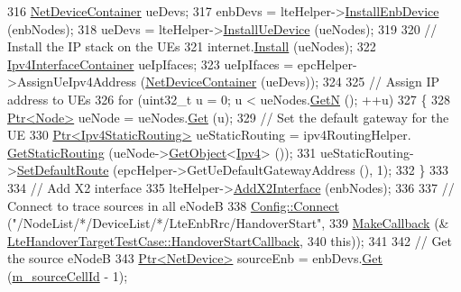 \begin{DoxyCode}
316   \hyperlink{classns3_1_1NetDeviceContainer}{NetDeviceContainer} ueDevs;
317   enbDevs = lteHelper->\hyperlink{classns3_1_1LteHelper_a5e009ad35ef85f46b5a6099263f15a03}{InstallEnbDevice} (enbNodes);
318   ueDevs = lteHelper->\hyperlink{classns3_1_1LteHelper_ac9cd932d7de92811cfa953c2e3b2fc9f}{InstallUeDevice} (ueNodes);
319 
320   \textcolor{comment}{// Install the IP stack on the UEs}
321   internet.\hyperlink{classns3_1_1InternetStackHelper_a6645b412f31283d2d9bc3d8a95cebbc0}{Install} (ueNodes);
322   \hyperlink{classns3_1_1Ipv4InterfaceContainer}{Ipv4InterfaceContainer} ueIpIfaces;
323   ueIpIfaces = epcHelper->AssignUeIpv4Address (\hyperlink{classns3_1_1NetDeviceContainer}{NetDeviceContainer} (ueDevs));
324 
325   \textcolor{comment}{// Assign IP address to UEs}
326   \textcolor{keywordflow}{for} (uint32\_t u = 0; u < ueNodes.\hyperlink{classns3_1_1NodeContainer_aed647ac56d0407a7706aba02eb44b951}{GetN} (); ++u)
327     \{
328       \hyperlink{classns3_1_1Ptr}{Ptr<Node>} ueNode = ueNodes.\hyperlink{classns3_1_1NodeContainer_a9ed96e2ecc22e0f5a3d4842eb9bf90bf}{Get} (u);
329       \textcolor{comment}{// Set the default gateway for the UE}
330       \hyperlink{classns3_1_1Ptr}{Ptr<Ipv4StaticRouting>} ueStaticRouting = ipv4RoutingHelper.
      \hyperlink{classns3_1_1Ipv4StaticRoutingHelper_a731206e50d305695dac7fb2ef963a4bb}{GetStaticRouting} (ueNode->\hyperlink{classns3_1_1Object_a13e18c00017096c8381eb651d5bd0783}{GetObject}<\hyperlink{classns3_1_1Ipv4}{Ipv4}> ());
331       ueStaticRouting->\hyperlink{classns3_1_1Ipv4StaticRouting_aee30fa3246c2b42f122dabdff2725331}{SetDefaultRoute} (epcHelper->GetUeDefaultGatewayAddress (), 1);
332     \}
333 
334   \textcolor{comment}{// Add X2 interface}
335   lteHelper->\hyperlink{classns3_1_1LteHelper_adbbd435f439200097e88a2965668bc26}{AddX2Interface} (enbNodes);
336 
337   \textcolor{comment}{// Connect to trace sources in all eNodeB}
338   \hyperlink{group__config_ga4014f151241cd0939b6cb64409605736}{Config::Connect} (\textcolor{stringliteral}{"/NodeList/*/DeviceList/*/LteEnbRrc/HandoverStart"},
339                    \hyperlink{group__makecallbackmemptr_ga9376283685aa99d204048d6a4b7610a4}{MakeCallback} (&
      \hyperlink{classLteHandoverTargetTestCase_ab31897a3c0cc8ee5da3daab82e80be43}{LteHandoverTargetTestCase::HandoverStartCallback},
340                                  \textcolor{keyword}{this}));
341 
342   \textcolor{comment}{// Get the source eNodeB}
343   \hyperlink{classns3_1_1Ptr}{Ptr<NetDevice>} sourceEnb = enbDevs.\hyperlink{classns3_1_1NetDeviceContainer_a677d62594b5c9d2dea155cc5045f4d0b}{Get} (\hyperlink{classLteHandoverTargetTestCase_aa919cf50724c078e53ca949f381d8b8a}{m\_sourceCellId} - 1);

\end{DoxyCode}
